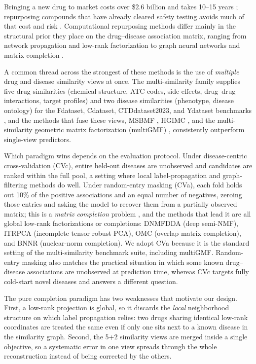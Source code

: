\documentclass[webpdf,modern,large]{oup-authoring-template}
\begin{document}
Bringing a new drug to market costs over \$2.6 billion and takes 10--15 years \citep{dimasi2003,paul2010}; repurposing compounds that have already cleared safety testing avoids much of that cost and risk \citep{chong2007}. Computational repurposing methods differ mainly in the structural prior they place on the drug--disease association matrix, ranging from network propagation \citep{yamanishi2008,martinez2015,luo2016} and low-rank factorization \citep{dai2015,ezzat2017,zheng2013,yang2020msbmf} to graph neural networks \citep{fu2022,gao2023} and matrix completion \citep{yang2019,luo2018,mongia2022}.

A common thread across the strongest of these methods is the use of \emph{multiple} drug and disease similarity views at once. The multi-similarity family supplies five drug similarities (chemical structure, ATC codes, side effects, drug--drug interactions, target profiles) and two disease similarities (phenotype, disease ontology) for the Fdataset, Cdataset, CTDdataset2023, and Ydataset benchmarks \citep{yang2020msbmf}, and the methods that fuse these views, MSBMF \citep{yang2020msbmf}, HGIMC \citep{yang2021hgimc}, and the multi-similarity geometric matrix factorization (multiGMF) \citep{yang2026multigmf}, consistently outperform single-view predictors.

Which paradigm wins depends on the evaluation protocol. Under disease-centric cross-validation (CVc), entire held-out diseases are unobserved and candidates are ranked within the full pool, a setting where local label-propagation and graph-filtering methods do well. Under random-entry masking (CVa), each fold holds out 10\% of the positive associations and an equal number of negatives, zeroing those entries and asking the model to recover them from a partially observed matrix; this is a \emph{matrix completion} problem \citep{candes2009}, and the methods that lead it are all global low-rank factorizations or completions: DNMFDDA (deep semi-NMF), ITRPCA (incomplete tensor robust PCA), OMC (overlap matrix completion), and BNNR (nuclear-norm completion). We adopt CVa because it is the standard setting of the multi-similarity benchmark suite, including multiGMF. Random-entry masking also matches the practical situation in which some known drug--disease associations are unobserved at prediction time, whereas CVc targets fully cold-start novel diseases and answers a different question.

The pure completion paradigm has two weaknesses that motivate our design. First, a low-rank projection is global, so it discards the \emph{local} neighborhood structure on which label propagation relies: two drugs sharing identical low-rank coordinates are treated the same even if only one sits next to a known disease in the similarity graph. Second, the 5+2 similarity views are merged inside a single objective, so a systematic error in one view spreads through the whole reconstruction instead of being corrected by the others.
\end{document}
